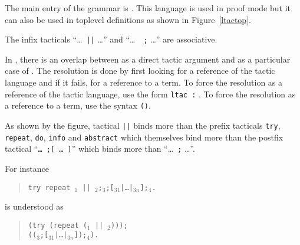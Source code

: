 The main entry of the grammar is {\tacexpr}. This language is used in
proof mode but it can also be used in toplevel definitions as shown in
Figure~\ref{ltactop}.

\begin{Remarks}
\item The infix tacticals ``\dots\ {\tt ||} \dots'' and ``\dots\ {\tt
    ;} \dots'' are associative. 

\item In {\tacarg}, there is an overlap between {\qualid} as a
direct tactic argument and {\qualid} as a particular case of
{\term}. The resolution is done by first looking for a reference of
the tactic language and if it fails, for a reference to a term. To
force the resolution as a reference of the tactic language, use the
form {\tt ltac :} {\qualid}. To force the resolution as a reference to
a term, use the syntax {\tt ({\qualid})}.

\item As shown by the figure, tactical {\tt ||} binds more than the
prefix tacticals {\tt try}, {\tt repeat}, {\tt do}, {\tt info} and
{\tt abstract} which themselves bind more than the postfix tactical
``{\tt \dots\ ;[ \dots\ ]}'' which binds more than ``\dots\ {\tt ;}
\dots''.

For instance
\begin{quote}
{\tt try repeat \tac$_1$ ||
  \tac$_2$;\tac$_3$;[\tac$_{31}$|\dots|\tac$_{3n}$];\tac$_4$.}
\end{quote}
is understood as 
\begin{quote}
{\tt (try (repeat (\tac$_1$ || \tac$_2$)));} \\
{\tt ((\tac$_3$;[\tac$_{31}$|\dots|\tac$_{3n}$]);\tac$_4$).}
\end{quote}
\end{Remarks}


